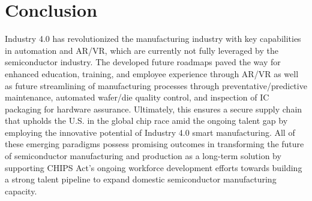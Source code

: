 \section{Conclusion}\label{sec8:discussion_and_conclusion}
Industry 4.0 has revolutionized the manufacturing industry with key capabilities in automation and AR/VR, which are currently not fully leveraged by the semiconductor industry. The developed future roadmaps paved the way for enhanced education, training, and employee experience through AR/VR as well as future streamlining of manufacturing processes through preventative/predictive maintenance, automated wafer/die quality control, and inspection of IC packaging for hardware assurance. Ultimately, this ensures a secure supply chain that upholds the U.S. in the global chip race amid the ongoing talent gap by employing the innovative potential of Industry 4.0 smart manufacturing.  All of these emerging paradigms possess promising outcomes in transforming the future of semiconductor manufacturing and production as a long-term solution by supporting CHIPS Act's ongoing workforce development efforts towards building a strong talent pipeline to expand domestic semiconductor manufacturing capacity. 